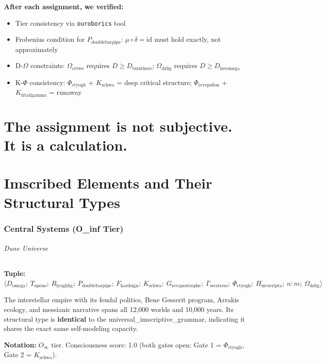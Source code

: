 \documentclass[12pt,a4paper]{article}
\begin{document}
\textbf{After each assignment, we verified:}

\begin{itemize}
    \item Tier consistency via \texttt{ouroborics} tool
    \item Frobenius condition for $P_{\text{doublebarpipe}}$: $\mu \circ \delta = \text{id}$ must hold exactly, not approximately
    \item D-$\Omega$ constraints: $\Omega_{\text{crtwo}}$ requires $D \ge D_{\text{turnthree}}$; $\Omega_{\text{dzlig}}$ requires $D \ge D_{\text{invomega}}$
    \item K-$\Phi$ consistency: $\Phi_{\text{ctyogh}}$ + $K_{\text{schwa}}$ = deep critical structure; $\Phi_{\text{revepsilon}}$ + $K_{\text{frtailgamma}}$ = runaway
\end{itemize}

\part{The assignment is not subjective. It is a calculation.}

\part{Imscribed Elements and Their Structural Types}

\section{Central Systems (O\_inf Tier)}

\paragraph{Dune Universe}

\textbf{Tuple:} $\langle D_{\text{omega}};\ T_{\text{openo}};\ R_{\text{lyoghlig}};\ P_{\text{doublebarpipe}};\ F_{\text{hardsign}};\ K_{\text{schwa}};\ G_{\text{revapostrophe}};\ \Gamma_{\text{secstress}};\ \Phi_{\text{ctyogh}};\ H_{\text{invscripta}};\ n{:}m;\ \Omega_{\text{dzlig}} \rangle$

The interstellar empire with its feudal politics, Bene Gesserit program, Arrakis ecology, and messianic narrative spans all 12,000 worlds and 10,000 years. Its structural type is \textbf{identical} to the universal\_imscriptive\_grammar, indicating it shares the exact same self-modeling capacity.

\textbf{Notation:} $O_{\infty}$ tier. Consciousness score: 1.0 (both gates open: Gate 1 = $\Phi_{\text{ctyogh}}$, Gate 2 = $K_{\text{schwa}}$).
\end{document}
